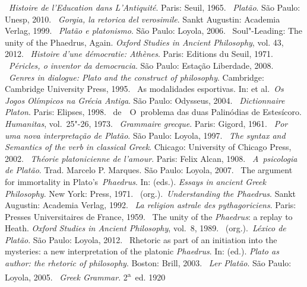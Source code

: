 \begin{bibliohedra}
~\emph{Histoire de l'Education dans L'Antiquité}. Paris:
  Seuil, 1965.
~\emph{Platão}. São Paulo: Unesp, 2010.
~\emph{Gorgia, la retorica del verosimile}. Sankt Augustin: Academia Verlag, 1999.
~\emph{Platão e platonismo}. São Paulo: Loyola, 2006.
~Soul"-Leading: The unity of the Phaedrus, Again. \emph{Oxford Studies in Ancient Philosophy}, vol. 43, 2012.
~\emph{Histoire d'une démocratie: Athènes}. Paris: Editions
  du Seuil, 1971.
~\emph{Péricles, o inventor da democracia}. São Paulo:
  Estação Liberdade, 2008.
~\emph{Genres in dialogue: Plato and the
  construct of philosophy}. Cambridge: Cambridge University Press, 1995.
~As modalidades esportivas. In:  et al.~\emph{Os Jogos
  Olímpicos na Grécia Antiga}. São Paulo: Odysseus, 2004.
~\emph{Dictionnaire Platon}. Paris:
  Elipses, 1998.
~de~~O~problema das duas Palinódias de
  Estesícoro. \emph{Humanitas}, vol.~25"-26, 1973.
~\emph{Grammaire grecque}. Paris: Gigord, 1961.
~\emph{Por uma nova interpretação de Platão}. São Paulo:
  Loyola, 1997.
~\emph{The syntax and Semantics of the verb in classical
  Greek}. Chicago: University of Chicago Press, 2002.
~\emph{Théorie platonicienne de l'amour}. Paris: Felix Alcan,
  1908.
~\emph{A~psicologia de Platão}. Trad. Marcelo P. Marques. São Paulo: Loyola, 2007.
~The argument for immortality in
  Plato's~\emph{Phaedrus}. In:  (eds.). \emph{Essays in ancient Greek Philosophy}.
  New York:  Press, 1971.
~(org.).~\emph{Understanding the Phaedrus}. Sankt Augustin:
  Academia Verlag, 1992.
~\emph{La religion astrale des pythagoriciens}. Paris:
  Presses Universitaires de France, 1959.
~The unity of the \emph{Phaedrus}: a replay to Heath. \emph{Oxford Studies in Ancient Philosophy}, vol.~8, 1989.
~(org.).~\emph{Léxico de Platão}. São Paulo: Loyola,
  2012.
~Rhetoric as part of an initiation into the
  mysteries: a new interpretation of the platonic \emph{Phaedrus}. In:  (ed.). \emph{Plato as
  author: the rhetoric of philosophy}. Boston: Brill, 2003.
~\emph{Ler Platão}. São Paulo: Loyola, 2005.
~\emph{Greek Grammar}. 2\textsuperscript{a}~ed. 1920

\end{bibliohedra}

